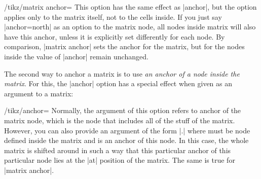 \begin{key}{/tikz/matrix anchor=}
    This option has the same effect as |anchor|, but the option applies only to
    the matrix itself, not to the cells inside. If you just say |anchor=north|
    as an option to the matrix node, all nodes inside matrix will also have
    this anchor, unless it is explicitly set differently for each node. By
    comparison, |matrix anchor| sets the anchor for the matrix, but for the
    nodes inside the value of |anchor| remain unchanged.
\begin{codeexample}[]
\end{codeexample}
\end{key}

The second way to anchor a matrix is to use \emph{an anchor of a node inside
the matrix}. For this, the |anchor| option has a special effect when given as
an argument to a matrix:

\begin{key}{/tikz/anchor=}
    Normally, the argument of this option refers to anchor of the matrix node,
    which is the node that includes all of the stuff of the matrix. However,
    you can also provide an argument of the form |.|
    where  must be node defined inside the matrix and 
    is an anchor of this node. In this case, the whole matrix is shifted around
    in such a way that this particular anchor of this particular node lies at
    the |at| position of the matrix. The same is true for |matrix anchor|.
\begin{codeexample}[]
\end{codeexample}
\end{key}


